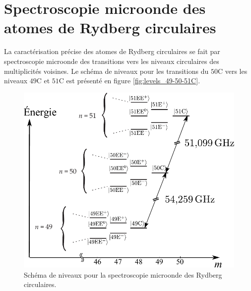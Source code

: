 \section{Spectroscopie microonde des atomes de Rydberg circulaires}
\noindent La caractérisation précise des atomes de Rydberg circulaires se fait par spectroscopie microonde des transitions vers les niveaux circulaires des multiplicités voisines.
%
Le schéma de niveaux pour les transitions du $\mathrm{50C}$ vers les niveaux $\mathrm{49C}$ et $\mathrm{51C}$ est présenté en figure \eqref{fig:levels_49-50-51C}.
\begin{figure}[h]
\centering
\includegraphics[width=.7\linewidth]{figures/circulars/levels_49-50-51C}
\caption[Schéma de niveaux pour la spectroscopie microonde des Rydberg circulaires]{
Schéma de niveaux pour la spectroscopie microonde des Rydberg circulaires.
}
\label{fig:levels_49-50-51C}
\end{figure}
%

